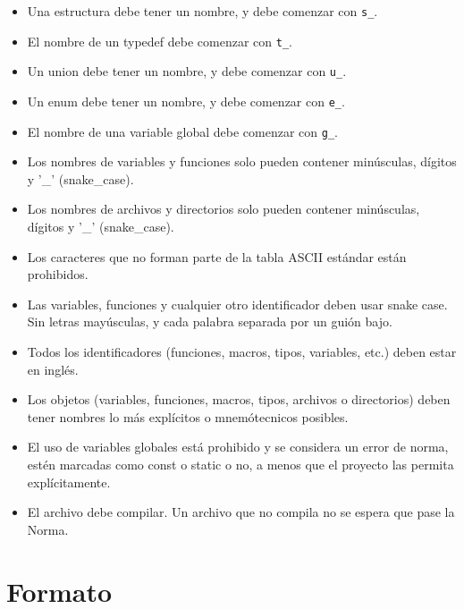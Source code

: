 \documentclass{42-es}
\begin{document}
\begin{itemize}

      \item Una estructura debe tener un nombre, y debe comenzar con \texttt{s\_}.
      \item El nombre de un typedef debe comenzar con \texttt{t\_}.
      \item Un union debe tener un nombre, y debe comenzar con \texttt{u\_}.
      \item Un enum debe tener un nombre, y debe comenzar con \texttt{e\_}.
      \item El nombre de una variable global debe comenzar con \texttt{g\_}.
      \item Los nombres de variables y funciones solo pueden contener
            minúsculas, dígitos y '\_' (snake\_case).
      \item Los nombres de archivos y directorios solo pueden contener
            minúsculas, dígitos y '\_' (snake\_case).
      \item Los caracteres que no forman parte de la tabla ASCII estándar están
            prohibidos.
      \item Las variables, funciones y cualquier otro identificador deben usar
            snake case. Sin letras mayúsculas, y cada palabra separada por un
            guión bajo.
      \item Todos los identificadores (funciones, macros, tipos, variables,
            etc.)
            deben estar en inglés.
      \item Los objetos (variables, funciones, macros, tipos, archivos o
            directorios) deben tener nombres lo más explícitos o mnemótecnicos
            posibles.
      \item El uso de variables globales está prohibido y se considera un error de
            norma, estén marcadas como const o static o no, a menos que el proyecto
            las permita explícitamente.
      \item El archivo debe compilar. Un archivo que no compila no se espera
            que
            pase la Norma.
\end{itemize}
\newpage

\section{Formato}
\end{document}
